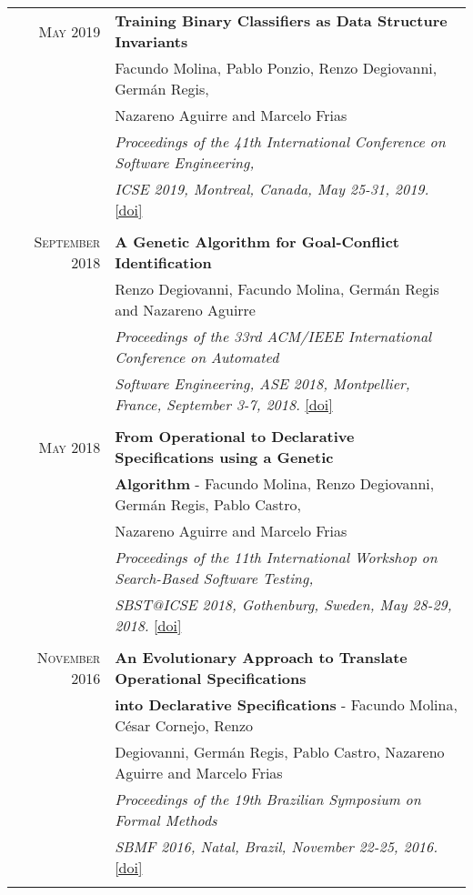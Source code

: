 \documentclass[a4paper,10pt]{article} %
\begin{document}
\begin{longtable}{rl}
\textsc{May} 2019  & \textbf{Training Binary Classifiers as Data Structure Invariants} \\ 
& Facundo Molina, Pablo Ponzio, Renzo Degiovanni, Germán Regis, \\ 
& Nazareno Aguirre and Marcelo Frias \\
& \textit{Proceedings of the 41th International Conference on Software Engineering,} \\
& \textit{ICSE 2019, Montreal, Canada, May 25-31, 2019.} \href{https://doi.ieeecomputersociety.org/10.1109/ICSE.2019.00084}{[doi]} \\ & \\

\textsc{September} 2018  & \textbf{A Genetic Algorithm for Goal-Conflict Identification} \\ 
& Renzo Degiovanni, Facundo Molina, Germán Regis and Nazareno Aguirre \\
& \textit{Proceedings of the 33rd ACM/IEEE International Conference on Automated } \\
& \textit{Software Engineering, ASE 2018, Montpellier, France, September 3-7, 2018.} \href{https://doi.org/10.1145/3238147.3238220}{[doi]} \\ & \\

\textsc{May} 2018  & \textbf{From Operational to Declarative Specifications using a Genetic} \\ & \textbf{Algorithm} - Facundo Molina, Renzo Degiovanni, Germán Regis, Pablo Castro,\\
& Nazareno Aguirre and Marcelo Frias \\
& \textit{Proceedings of the 11th International Workshop on Search-Based Software Testing,} \\
& \textit{SBST@ICSE 2018, Gothenburg, Sweden, May 28-29, 2018.} \href{https://dl.acm.org/doi/10.1145/3194718.3194725}{[doi]} \\ & \\

\textsc{November} 2016 & \textbf{An Evolutionary Approach to Translate Operational Specifications} \\ & \textbf{into Declarative Specifications} - Facundo Molina, César Cornejo, Renzo \\
& Degiovanni, Germán Regis, Pablo Castro, Nazareno Aguirre and Marcelo Frias \\
& \textit{Proceedings of the 19th Brazilian Symposium on Formal Methods} \\ 
& \textit{SBMF 2016, Natal, Brazil, November 22-25, 2016.} \href{https://doi.org/10.1007/978-3-319-49815-7_9}{[doi]} \\ & \\

\end{longtable}
\end{document}
